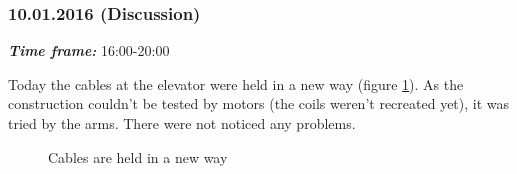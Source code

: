 \subsubsection{10.01.2016 (Discussion)}
\textit{\textbf{Time frame:}} 16:00-20:00 

Today the cables at the elevator were held in a new way (figure \ref{Elevator3.3}). As the construction couldn't be tested by motors (the coils weren't recreated yet), it was tried by the arms. There were not noticed any problems.

\begin{figure}[H]
	\begin{minipage}[h]{1\linewidth}
		\caption{Cables are held in a new way}
		\label{Elevator3.3}
	\end{minipage}
\end{figure}

